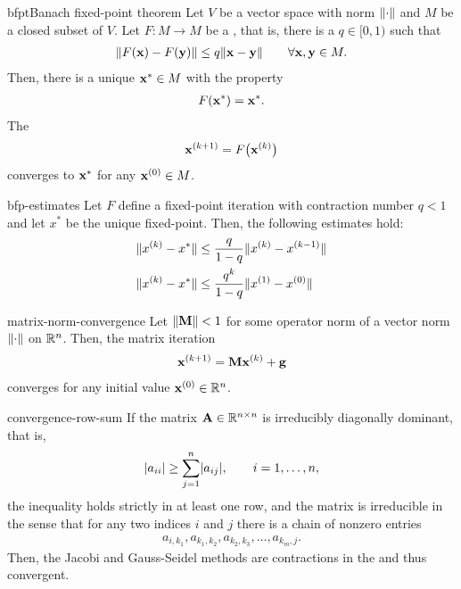 \begin{Theorem*}{bfpt}{Banach fixed-point theorem}
  Let $V$ be a vector space with norm $\lVert\cdot\rVert$ and $M$ be a
  closed subset of $V$. Let $F\colon M\to M$ be a ,
  that is, there is a  $q\in[0,1)$ such that
  \begin{gather}
    \norm*{F(\vx)-F(\vy)} \le q \norm*{\vx-\vy}\qquad\forall \vx,\vy\in M.
  \end{gather}
  Then, there is a unique  $\mathbf x^*\in M$ with the property
  \begin{gather}
    F(\mathbf x^*) = \mathbf x^*.
  \end{gather}
  The 
  \begin{gather}
    \mathbf x^{(k+1)} = F\bigl(\mathbf x^{(k)}\bigr)
  \end{gather}
  converges to $\mathbf x^*$ for any $\mathbf x^{(0)}\in M$.
\end{Theorem*}

\begin{Corollary}{bfp-estimates}
  Let $F$ define a fixed-point iteration with contraction number $q<1$
  and let $x^*$ be the unique fixed-point. Then, the following
  estimates hold:
  \begin{align}
    \lVert x^{(k)} - x^*\rVert &\le \frac{q}{1-q} \lVert x^{(k)}-x^{(k-1)}\rVert\\
    \lVert x^{(k)} - x^*\rVert &\le \frac{q^k}{1-q} \lVert x^{(1)}-x^{(0)}\rVert
  \end{align}
\end{Corollary}  

\begin{Corollary}{matrix-norm-convergence}
  Let $\lVert\mathbf M\rVert < 1$ for some operator norm of a vector norm $\lVert\cdot\rVert$ on $\mathbb R^n$. Then, the matrix iteration
  \begin{gather}
    \mathbf x^{(k+1)} = \mathbf M \mathbf x^{(k)} + \mathbf g
  \end{gather}
  converges for any initial value $\mathbf x^{(0)}\in\mathbb R^n$.
\end{Corollary}

\begin{Example}{convergence-row-sum}
  If the matrix $\mathbf A\in\mathbb R^{n\times n}$ is irreducibly diagonally dominant, that is,
  \begin{gather}
    \lvert a_{ii}\rvert \ge \sum_{j=1}^n \lvert a_{ij}\rvert,\qquad i=1,\dots,n,
  \end{gather}
  the inequality holds strictly in at least one row, and the matrix is
  irreducible in the sense that for any two indices $i$ and $j$ there
  is a chain of nonzero entries
  \begin{gather}
    a_{i,k_{1}}, a_{k_{1},k_{2}}, a_{k_{2},k_{3}},\dots, a_{k_{m},j}.
  \end{gather}
  Then, the Jacobi and Gauss-Seidel methods are contractions in the
   and thus convergent.
\end{Example}

